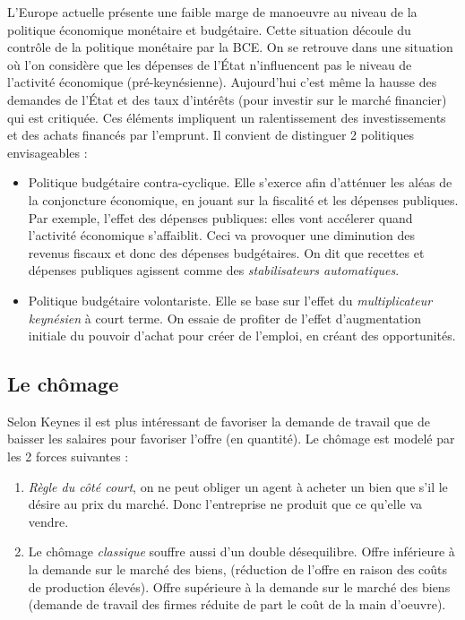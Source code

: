 L'Europe actuelle présente une faible marge de manoeuvre au niveau de la politique économique monétaire et budgétaire. Cette situation découle du contrôle de 
la politique monétaire par la BCE. On se retrouve dans une situation où l'on considère que les dépenses de l'État n'influencent pas le niveau de l'activité 
économique (pré-keynésienne). Aujourd'hui c'est même la hausse des demandes de l'État et des taux d'intérêts (pour investir sur le marché financier) qui est 
critiquée. Ces éléments impliquent un ralentissement des investissements et des achats financés par l'emprunt. Il convient de distinguer 2 politiques 
envisageables : 
\begin{itemize}[label=]
	\item Politique budgétaire contra-cyclique. Elle s'exerce afin d'atténuer les aléas de la conjoncture économique, en jouant sur la fiscalité et les 
	dépenses publiques. Par exemple, l'effet des dépenses publiques: elles vont accélerer quand l'activité économique s'affaiblit. Ceci va provoquer une 
	diminution des revenus fiscaux et donc des dépenses budgétaires. On dit que recettes et dépenses publiques agissent comme des \emph{stabilisateurs
	automatiques}.
	\item Politique budgétaire volontariste. Elle se base sur l'effet du \emph{multiplicateur keynésien} à court terme. On essaie de profiter de l'effet
	d'augmentation initiale du pouvoir d'achat pour créer de l'emploi, en créant des opportunités. 
\end{itemize}


\subsection{Le chômage} %
\label{sub:le_chomage}

Selon Keynes il est plus intéressant de favoriser la demande de travail que de baisser les salaires pour favoriser l'offre (en quantité).
Le chômage est modelé par les 2 forces suivantes : 
\begin{enumerate}
	\item \emph{Règle du côté court}, on ne peut obliger un agent à acheter un bien que s'il le désire au prix du marché. Donc l'entreprise ne produit que ce 
	qu'elle va vendre.
	\item Le chômage \emph{classique} souffre aussi d'un double désequilibre. Offre inférieure à la demande sur le marché des biens, (réduction de l'offre
	en raison des coûts de production élevés). Offre supérieure à la demande sur le marché des biens (demande de travail des firmes réduite de part 
	le coût de la main d'oeuvre).
\end{enumerate}

